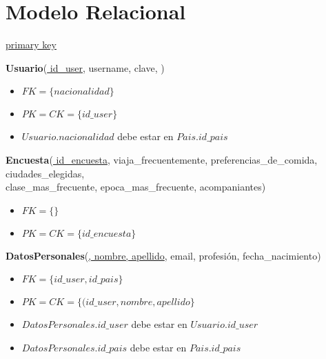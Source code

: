 \section{Modelo Relacional}

\begin{framed} \centering
  \underline{primary key} \hspace*{3cm}
\end{framed}


\vspace*{0.1cm}
\noindent
\textbf{Usuario}(\underline{
	id\_user}, 
	username, 
	clave, )

\begin{itemize}[noitemsep]
	\item $FK = \{nacionalidad\}$
	\item $PK = CK = \{id\_user\}$
	\item $Usuario.nacionalidad$ debe estar en $Pais.id\_pais$
\end{itemize}


\vspace*{0.1cm}
\noindent
\textbf{Encuesta}(\underline{
	id\_encuesta},
	viaja\_frecuentemente, 
	preferencias\_de\_comida, 
	ciudades\_elegidas, \\ \hspace*{2cm} 
	clase\_mas\_frecuente, 
	epoca\_mas\_frecuente, 
	acompaniantes)
\begin{itemize}[noitemsep]
	\item $FK = \{\}$
	\item $PK = CK = \{id\_encuesta\}$	
\end{itemize}


\vspace*{0.1cm}
\noindent
\textbf{DatosPersonales}(\underline{, 
	nombre, 
	apellido},
	email, 
	profesión, 
	fecha\_nacimiento)

\begin{itemize}[noitemsep]
	\item $FK = \{id\_user, id\_pais\}$
	\item $PK = CK = \{(id\_user, nombre, apellido\}$
	\item $DatosPersonales.id\_user$ debe estar en $Usuario.id\_user$
	\item $DatosPersonales.id\_pais$ debe estar en $Pais.id\_pais$
\end{itemize}

